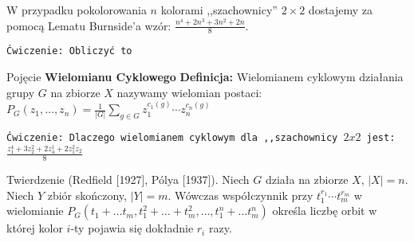 \documentclass{beamer}
\begin{document}
\begin{frame}
  W przypadku pokolorowania $n$ kolorami ,,szachownicy'' $2\times 2$
  dostajemy za pomocą Lematu Burnside'a wzór:
  $\frac{n^4 + 2 n^3 + 3 n^2 + 2 n }{8}$.

  {\tt Ćwiczenie: Obliczyć to}
  
\end{frame}

\begin{frame}
  \begin{block}{Pojęcie {\bf Wielomianu Cyklowego}}
    {\bf Definicja:} Wielomianem cyklowym działania grupy $G$
    na zbiorze $X$ nazywamy
    wielomian postaci:
    $P_G(z_1, \ldots, z_n) = \frac{1}{|G|} \sum_{g\in G} z_1^{c_1(g)} \cdots z_n^{c_n(g)}$
    
    
    \end{block}
  {\tt Ćwiczenie: Dlaczego wielomianem cyklowym dla ,,szachownicy $2x2$ jest:}
  $\frac{z_1^4 + 3 z_2^2 + 2 z_4^1 + 2 z_1^2 z_2}{8}$

\end{frame}

\begin{frame}
  Twierdzenie (Redfield [1927], P\'{o}lya [1937]). Niech $G$ działa na zbiorze
  $X$, $|X| = n$. Niech $Y$ zbiór skończony, $|Y| = m$.
  Wówczas współczynnik przy $t_1^{r_1} \cdots t_m^{r_m}$
  w wielomianie $P_G(t_1 + \ldots t_m, t_1^2 + \ldots + t_m^2, \ldots,
  t_1^n + \ldots t_m^n)$
  określa liczbę orbit w której kolor $i$-ty pojawia się dokładnie $r_i$ razy.
  \end{frame}
\end{document}
